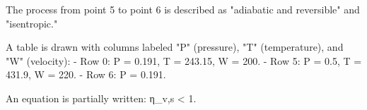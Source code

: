 The process from point 5 to point 6 is described as "adiabatic and reversible" and "isentropic."  

A table is drawn with columns labeled "P" (pressure), "T" (temperature), and "W" (velocity):  
- Row 0: P = 0.191, T = 243.15, W = 200.  
- Row 5: P = 0.5, T = 431.9, W = 220.  
- Row 6: P = 0.191.  

An equation is partially written:  
η_v,s < 1.